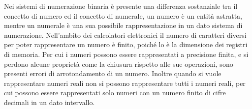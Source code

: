 \documentclass{article}
\numberwithin{equation}{subsection}
\begin{document}
Nei sistemi di numerazione binaria è presente una differenza sostanziale tra il concetto di numero ed il concetto di numerale, un numero è un entità astratta, mentre un 
numerale è una sua possibile rappresentazione in un dato sistema di numerazione. 
Nell'ambito dei calcolatori elettronici il numero di caratteri diversi per poter rappresentare un numero è finito, poiché lo è la dimensione dei registri di memoria. Per cui 
i numeri possono essere rappresentati a precisione finita, e si perdono alcune proprietà come la chiusura rispetto alle sue operazioni, sono presenti errori di arrotondamento di 
un numero. Inoltre quando si vuole rappresentare numeri reali non si possono rappresentare tutti i numeri reali, per cui possono essere rappresentati solo numeri con un numero 
finito di cifre decimali in un dato intervallo. 
\end{document}
